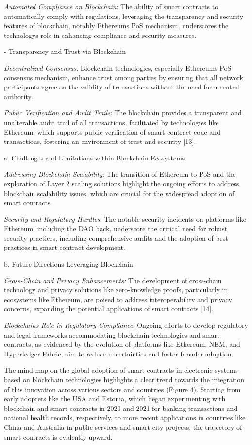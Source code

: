 \begin{multicols}{2}
\emph{Automated Compliance on Blockchain}: The ability of smart
contracts to automatically comply with regulations, leveraging the
transparency and security features of blockchain, notably
Ethereum\textquotesingle s PoS mechanism, underscores the
technology\textquotesingle s role in enhancing compliance and security
measures.

- Transparency and Trust via Blockchain

\emph{Decentralized Consensus:} Blockchain technologies, especially
Ethereum\textquotesingle s PoS consensus mechanism, enhance trust among
parties by ensuring that all network participants agree on the validity
of transactions without the need for a central authority.

\emph{Public Verification and Audit Trails}: The blockchain provides a
transparent and unalterable audit trail of all transactions, facilitated
by technologies like Ethereum, which supports public verification of
smart contract code and transactions, fostering an environment of trust
and security {[}13{]}.

a. Challenges and Limitations within Blockchain Ecosystems

\emph{Addressing Blockchain Scalability}: The transition of Ethereum to
PoS and the exploration of Layer 2 scaling solutions highlight the
ongoing efforts to address blockchain scalability issues, which are
crucial for the widespread adoption of smart contracts.

\emph{Security and Regulatory Hurdles}: The notable security incidents
on platforms like Ethereum, including the DAO hack, underscore the
critical need for robust security practices, including comprehensive
audits and the adoption of best practices in smart contract development.

b. Future Directions Leveraging Blockchain

\emph{Cross-Chain and Privacy Enhancements:} The development of
cross-chain technology and privacy solutions like zero-knowledge proofs,
particularly in ecosystems like Ethereum, are poised to address
interoperability and privacy concerns, expanding the potential
applications of smart contracts {[}14{]}.

\emph{Blockchain\textquotesingle s Role in Regulatory Compliance}:
Ongoing efforts to develop regulatory and legal frameworks accommodating
blockchain technologies and smart contracts, as evidenced by the
evolution of platforms like Ethereum, NEM, and Hyperledger Fabric, aim
to reduce uncertainties and foster broader adoption.

The mind map on the global adoption of smart contracts in electronic
systems based on blockchain technologies highlights a clear trend
towards the integration of this innovation across various sectors and
countries (Figure 4). Starting from early adopters like the USA and
Estonia, which began experimenting with blockchain and smart contracts
in 2020 and 2021 for banking transactions and national health records,
respectively, to more recent applications in countries like China and
Australia in public services and smart city projects, the trajectory of
smart contracts is evidently upward.
\end{multicols}

